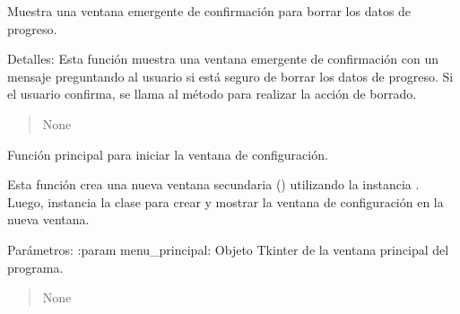 \documentclass[letterpaper,10pt,spanish]{sphinxmanual}
\begin{document}
\begin{fulllineitems}
\begin{fulllineitems}
\end{fulllineitems}


\begin{fulllineitems}
\label{\detokenize{configuracion:configuracion.Configuracion.mostrar_confirmacion}}
\pysigstartsignatures
{}
\pysigstopsignatures
\sphinxAtStartPar
Muestra una ventana emergente de confirmación para borrar los datos de progreso.

\sphinxAtStartPar
Detalles:
Esta función muestra una ventana emergente de confirmación con un mensaje preguntando
al usuario si está seguro de borrar los datos de progreso. Si el usuario confirma,
se llama al método  para realizar la acción de borrado.
\begin{quote}\begin{description}
\sphinxAtStartPar
None

\end{description}\end{quote}

\end{fulllineitems}


\end{fulllineitems}


\begin{fulllineitems}
\label{\detokenize{configuracion:configuracion.main}}
\pysigstartsignatures
{}
\pysigstopsignatures
\sphinxAtStartPar
Función principal para iniciar la ventana de configuración.

\sphinxAtStartPar
Esta función crea una nueva ventana secundaria () utilizando
la instancia . Luego, instancia la clase 
para crear y mostrar la ventana de configuración en la nueva ventana.

\sphinxAtStartPar
Parámetros:
:param menu\_principal: Objeto Tkinter de la ventana principal del programa.
\begin{quote}\begin{description}
\sphinxAtStartPar
None

\end{description}\end{quote}

\end{fulllineitems}
\end{document}
